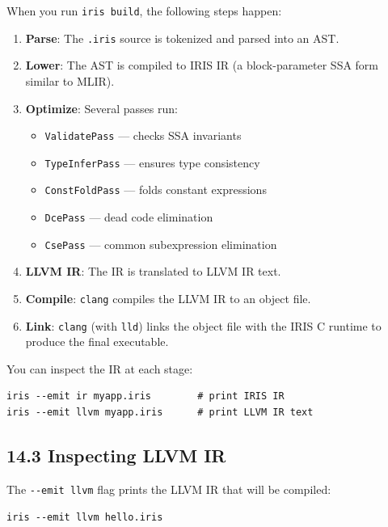 \documentclass[
  english,
]{book}
\providecommand{\tightlist}{%
  \setlength{\itemsep}{0pt}\setlength{\parskip}{0pt}}
\begin{document}
When you run \texttt{iris\ build}, the following steps happen:

\begin{enumerate}
\def\labelenumi{\arabic{enumi}.}
\tightlist
\item
  \textbf{Parse}: The \texttt{.iris} source is tokenized and parsed into
  an AST.
\item
  \textbf{Lower}: The AST is compiled to IRIS IR (a block-parameter SSA
  form similar to MLIR).
\item
  \textbf{Optimize}: Several passes run:

  \begin{itemize}
  \tightlist
  \item
    \texttt{ValidatePass} --- checks SSA invariants
  \item
    \texttt{TypeInferPass} --- ensures type consistency
  \item
    \texttt{ConstFoldPass} --- folds constant expressions
  \item
    \texttt{DcePass} --- dead code elimination
  \item
    \texttt{CsePass} --- common subexpression elimination
  \end{itemize}
\item
  \textbf{LLVM IR}: The IR is translated to LLVM IR text.
\item
  \textbf{Compile}: \texttt{clang} compiles the LLVM IR to an object
  file.
\item
  \textbf{Link}: \texttt{clang} (with \texttt{lld}) links the object
  file with the IRIS C runtime to produce the final executable.
\end{enumerate}

You can inspect the IR at each stage:

\begin{verbatim}
iris --emit ir myapp.iris        # print IRIS IR
iris --emit llvm myapp.iris      # print LLVM IR text
\end{verbatim}

\subsection{14.3 Inspecting LLVM IR}\label{inspecting-llvm-ir}

The \texttt{-\/-emit\ llvm} flag prints the LLVM IR that will be
compiled:

\begin{verbatim}
iris --emit llvm hello.iris
\end{verbatim}
\end{document}
